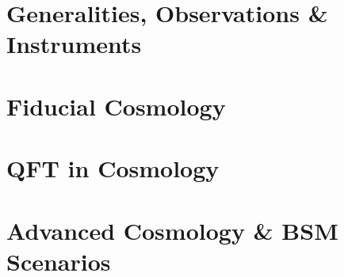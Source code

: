 \documentclass[../all_subjects_main.tex]{subfiles}
\begin{document}
\IfSubfilesClassLoaded{%
    \frontmatter
    
    
    \newpage
    
    \newpage
    
    \newpage
    \tableofcontents
    \mainmatter
}{}



\part{Generalities, Observations \& Instruments}




\part{Fiducial Cosmology}

















\part{QFT in Cosmology}






\part{Advanced Cosmology \& BSM Scenarios}






\end{document}

